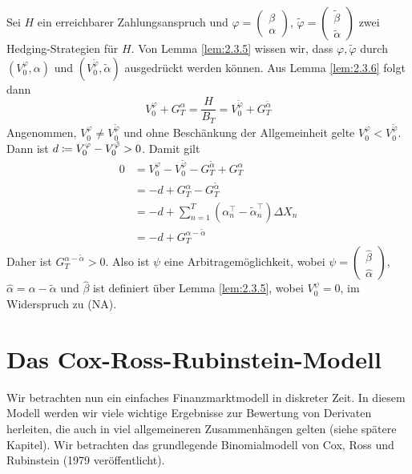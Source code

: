 \documentclass[a4paper,twoside,DIV15,BCOR12mm]{scrbook}
\begin{document}
\begin{beweis}
Sei $H$ ein erreichbarer Zahlungsanspruch und $\varphi =
\left(\begin{smallmatrix} \beta \\ \alpha \end{smallmatrix}\right)$, $\tilde\varphi =
\left(\begin{smallmatrix} \tilde\beta \\ \tilde\alpha \end{smallmatrix}\right)$ zwei Hedging-Strategien für $H$. Von Lemma \ref{lem:2.3.5} wissen wir, dass $\varphi, \tilde\varphi$ durch $(V_0^\varphi,\alpha)$ und $(V_0^{\tilde\varphi},\tilde\alpha)$ ausgedrückt werden können. Aus Lemma \ref{lem:2.3.6} folgt dann
\[
V_0^\varphi + G_T^\alpha = \frac H {B_T} = V_0^{\tilde\varphi} + G_T^{\tilde\alpha}
\]
Angenommen, $V_0^\varphi \ne V_0^{\tilde\varphi}$ und ohne Beschänkung der Allgemeinheit gelte $V_0^\varphi < V_0^{\tilde\varphi}$. Dann ist $d \da V_0^\varphi - V_0^{\tilde\varphi} > 0$. Damit gilt
\begin{align*}
0 &= V_0^\varphi - V_0^{\tilde\varphi} - G_T^{\tilde\alpha} + G_T^\alpha  \\
&= -d + G_T^\alpha  - G_T^{\tilde\alpha}  \\
&= -d + \sum_{n=1}^T (\alpha_n^\top - \tilde\alpha_n^\top) \Delta X_n \\
&= -d + G_T^{\alpha-\tilde\alpha}
\end{align*}
Daher ist $G_T^{\alpha-\tilde\alpha}>0$. Also ist $\psi$ eine Arbitragemöglichkeit, wobei $\psi = 
\left(\begin{smallmatrix} \hat\beta \\ \hat\alpha \end{smallmatrix}\right)$, $\hat\alpha = \alpha -\tilde\alpha$ und $\hat\beta$ ist definiert über Lemma \ref{lem:2.3.5}, wobei $V_0^\psi=0$, im Widerspruch zu (NA).
\end{beweis}

\section{Das Cox-Ross-Rubinstein-Modell}

Wir betrachten nun ein einfaches  Finanzmarktmodell in diskreter Zeit. In diesem Modell werden wir viele wichtige Ergebnisse zur Bewertung von Derivaten herleiten, die auch in viel allgemeineren Zusammenhängen gelten (siehe spätere Kapitel). Wir betrachten das grundlegende Binomialmodell von Cox, Ross und Rubinstein (1979 veröffentlicht).
\end{document}

